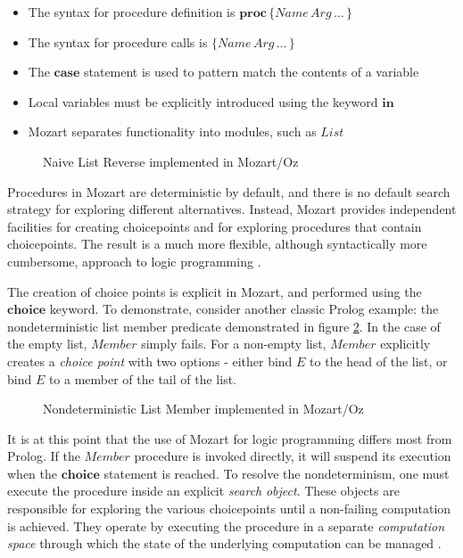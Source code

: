 \begin{itemize}
\item The syntax for procedure definition is $\mathbf{proc}\,\{Name\, Arg\,\dots\,\}$ 
\item The syntax for procedure calls is $\{Name\, Arg\,\dots\,\}$ 
\item The $\mathbf{case}$ statement is used to pattern match the contents
of a variable 
\item Local variables must be explicitly introduced using the keyword $\mathbf{in}$ 
\item Mozart separates functionality into modules, such as $List$ 
\end{itemize}
%
\begin{figure}[t]

\caption{Naive List Reverse implemented in Mozart/Oz\label{fig:Background:Naive-List-Reverse}}

\end{figure}


Procedures in Mozart are deterministic by default, and there is no
default search strategy for exploring different alternatives. Instead,
Mozart provides independent facilities for creating choicepoints and
for exploring procedures that contain choicepoints. The result is
a much more flexible, although syntactically more cumbersome, approach
to logic programming \citep{lpinoz99}.

The creation of choice points is explicit in Mozart, and performed
using the $\mathbf{choice}$ keyword. To demonstrate, consider another
classic Prolog example: the nondeterministic list member predicate
demonstrated in figure \ref{fig:Background:Nondet-Member}. In the
case of the empty list, $Member$ simply fails. For a non-empty list,
$Member$ explicitly creates a \emph{choice point} with two options
- either bind $E$ to the head of the list, or bind $E$ to a member
of the tail of the list.

%
\begin{figure}[t]

\caption{Nondeterministic List Member implemented in Mozart/Oz\label{fig:Background:Nondet-Member}}

\end{figure}


It is at this point that the use of Mozart for logic programming differs
most from Prolog. If the $Member$ procedure is invoked directly,
it will suspend its execution when the $\mathbf{choice}$ statement
is reached. To resolve the nondeterminism, one must execute the procedure
inside an explicit \emph{search} \emph{object}. These objects are
responsible for exploring the various choicepoints until a non-failing
computation is achieved. They operate by executing the procedure in
a separate \emph{computation space} through which the state of the
underlying computation can be managed \citep{schulte00constraint_services}.

